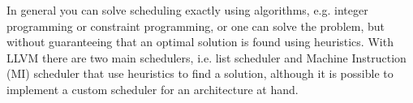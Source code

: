 In general you can solve scheduling exactly using algorithms, e.g. integer programming or constraint programming, or one can solve the problem, but without guaranteeing that an optimal solution is found using heuristics. With LLVM there are two main schedulers, i.e. list scheduler and Machine Instruction (MI) scheduler that use heuristics to find a solution, although it is possible to implement a custom scheduler for an architecture at hand. 





%




